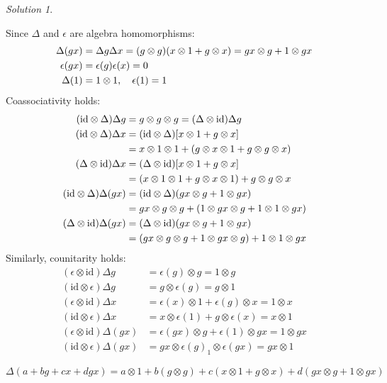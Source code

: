 \documentclass{article}
\theoremstyle{definition}
\theoremstyle{remark}
\newtheorem*{Solution*}{Solution}
\theoremstyle{underline}
\theoremstyle{underline}
\newcommand{\id}{\mathrm{id}}
\begin{document}
\begin{Solution*}
\begin{subquests}
			\item Since $\Delta$ and $\epsilon$ are algebra homomorphisms:
			\begin{align*}
			\Delta(gx) & = \Delta g \Delta x = \pqty{g \otimes g}\pqty{x \otimes 1 + g \otimes x} = gx \otimes g + 1 \otimes gx \\
			\epsilon(gx) & = \epsilon(g) \epsilon(x) = 0\\
			\Delta(1) & = 1 \otimes 1, \quad \epsilon(1) = 1
			\end{align*}
			Coassociativity holds:
			\begin{align*}
			 	(\id \otimes \Delta) \Delta g & = g \otimes g \otimes g = (\Delta \otimes \id) \Delta g \\
			 	(\id \otimes \Delta) \Delta x & = (\id \otimes \Delta) \bqty{x \otimes 1 + g \otimes x} \\
			 		& = x \otimes 1 \otimes 1 + \pqty{g \otimes x \otimes 1 + g \otimes g \otimes x} \\
			 	(\Delta \otimes \id) \Delta x & = (\Delta \otimes \id)\bqty{x \otimes 1 + g \otimes x} \\
				 	& =  \pqty{x \otimes 1 \otimes 1 + g \otimes x \otimes 1} + g \otimes g \otimes x \\
				(\id \otimes \Delta)\Delta (gx) & = (\id \otimes \Delta)\pqty{gx \otimes g + 1 \otimes gx} \\
					& = gx \otimes g \otimes g + \pqty{1 \otimes gx \otimes g + 1 \otimes 1 \otimes gx} \\
				(\Delta \otimes \id)\Delta (gx) & = (\Delta \otimes \id)\pqty{gx \otimes g + 1 \otimes gx} \\
					& = \pqty{gx \otimes g \otimes g + 1 \otimes gx \otimes g} + 1 \otimes 1 \otimes gx
			\end{align*}
			Similarly, counitarity holds:
			\begin{align*}
			(\epsilon \otimes \id) \Delta g & = \epsilon (g) \otimes g = 1 \otimes g\\
			(\id \otimes \epsilon) \Delta g & = g \otimes \epsilon(g) = g \otimes 1\\
			(\epsilon \otimes \id) \Delta x & = \epsilon(x) \otimes 1 + \epsilon(g) \otimes x = 1 \otimes x\\
			(\id \otimes \epsilon) \Delta x & = x \otimes \epsilon(1) + g \otimes \epsilon(x) = x \otimes 1\\
			(\epsilon \otimes \id) \Delta(gx) & = \epsilon(gx) \otimes g + \epsilon(1) \otimes gx = 1 \otimes gx\\
			(\id \otimes \epsilon) \Delta(gx) & = gx \otimes \epsilon(g) _ 1 \otimes \epsilon(gx) = gx \otimes 1
			\end{align*}

			\item $\Delta(a + bg + cx + dgx) = a \otimes 1 + b(g \otimes g) + c(x \otimes 1 + g \otimes x) + d(gx \otimes g + 1 \otimes gx)$ 
		\end{subquests}
	\end{Solution*}
\end{document}

